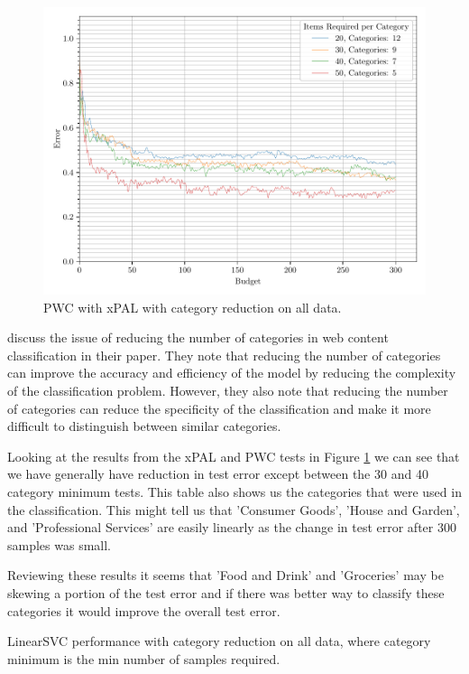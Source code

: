 \begin{figure}[ht]
    \centering
    \includegraphics[width=\textwidth]{../img/plot_text_data_all_category_reduction_test_results}
    \caption{PWC with xPAL with category reduction on all data.}
    \label{fig:all_data_category_reduction_xpal}
\end{figure}

\cite{dumais2000hierarchical} discuss the issue of reducing the number of categories in web content classification in their paper. They note that reducing the number of categories can improve the accuracy and efficiency of the model by reducing the complexity of the classification problem. However, they also note that reducing the number of categories can reduce the specificity of the classification and make it more difficult to distinguish between similar categories.

Looking at the results from the xPAL and PWC tests in Figure \ref{fig:all_data_category_reduction_xpal} we can see that we have generally have reduction in test error except between the 30 and 40 category minimum tests. This table also shows us the categories that were used in the classification. This might tell us that 'Consumer Goods', 'House and Garden', and 'Professional Services' are easily linearly as the change in test error after 300 samples was small.

Reviewing these results it seems that 'Food and Drink' and 'Groceries' may be skewing a portion of the test error and if there was better way to classify these categories it would improve the overall test error.

\begin{table}[ht]
     \centering  
     \caption{LinearSVC performance with category reduction on all data, where category minimum is the min number of samples required.}
     
     \label{tab:lscv_all_data_category_reduction} 
\end{table}

